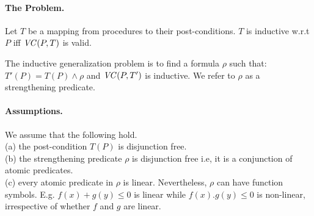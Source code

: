 \paragraph{The Problem.}

Let $T$ be a mapping from procedures to their post-conditions. $T$ is inductive w.r.t $P$ 
iff $\mathit{VC}(P,T)$ is valid.

The inductive generalization problem is to find a formula $\rho$ such that:
$T'(P) = T(P) \wedge \rho$ and $\mathit{VC}(P,T')$ is inductive.
We refer to $\rho$ as a strengthening predicate. 

\paragraph{Assumptions.}

We assume that the following hold. \\
(a) the post-condition $T(P)$ is disjunction free.  \\
(b) the strengthening predicate $\rho$ is disjunction free i.e, it is a conjunction of atomic predicates. \\
(c) every atomic predicate in $\rho$ is linear. Nevertheless, $\rho$ can have function symbols. 
E.g. $f(x) + g(y) \le 0$ is linear while $f(x).g(y) \le 0$ is non-linear, irrespective
of whether $f$ and $g$ are linear.

